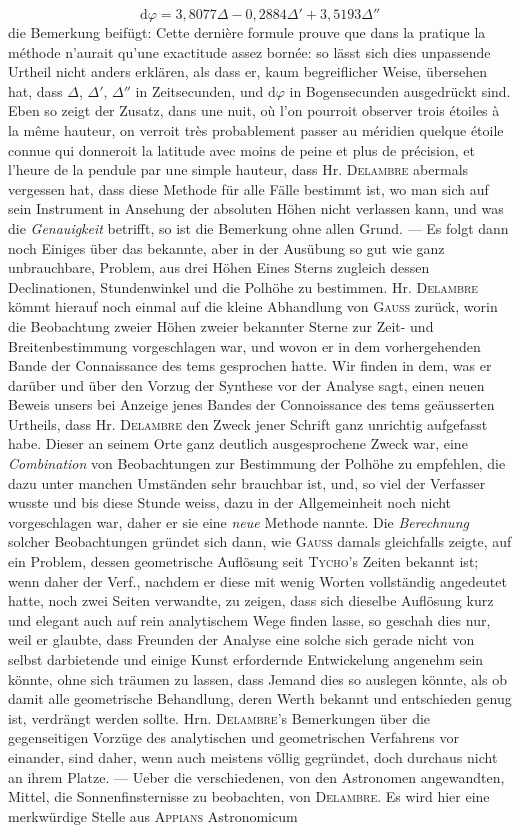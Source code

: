 \noindent \[ \mathrm{d}\varphi = 3{,}8077\Delta - 0{,}2884\Delta' + 3{,}5193\Delta'' \] die Bemerkung beifügt: Cette dernière formule prouve que dans la pratique la méthode n'aurait qu'une exactitude assez bornée: so lässt sich dies unpassende Urtheil nicht anders erklären, als dass er, kaum begreiflicher Weise, übersehen hat, dass $\Delta$, $\Delta'$, $\Delta''$ in Zeitsecunden, und $\mathrm{d}\varphi$ in Bogensecunden ausgedrückt sind. Eben so zeigt der Zusatz, dans une nuit, où l'on pourroit observer trois étoiles à la même hauteur, on verroit très probablement passer au méridien quelque étoile connue qui donneroit la latitude avec moins de peine et plus de précision, et l'heure de la pendule par une simple hauteur, dass Hr. \textsc{Delambre} abermals vergessen hat, dass diese Methode für alle Fälle bestimmt ist, wo man sich auf sein Instrument in Ansehung der absoluten Höhen nicht verlassen kann, und was die \emph{Genauigkeit} betrifft, so ist die Bemerkung ohne allen Grund. --- Es folgt dann noch Einiges über das bekannte, aber in der Ausübung so gut wie ganz unbrauchbare, Problem, aus drei Höhen Eines Sterns zugleich dessen Declinationen, Stundenwinkel und die Polhöhe zu bestimmen. Hr. \textsc{Delambre} kömmt hierauf noch einmal auf die kleine Abhandlung von \textsc{Gauss} zurück, worin die Beobachtung zweier Höhen zweier bekannter Sterne zur Zeit- und Breitenbestimmung vorgeschlagen war, und wovon er in dem vorhergehenden Bande der Connaissance des tems gesprochen hatte. Wir finden in dem, was er darüber und über den Vorzug der Synthese vor der Analyse sagt, einen neuen Beweis unsers bei Anzeige jenes Bandes der Connoissance des tems geäusserten Urtheils, dass Hr. \textsc{Delambre} den Zweck jener Schrift ganz unrichtig aufgefasst habe. Dieser an seinem Orte ganz deutlich ausgesprochene Zweck war, eine \emph{Combination} von Beobachtungen zur Bestimmung der Polhöhe zu empfehlen, die dazu unter manchen Umständen sehr brauchbar ist, und, so viel der Verfasser wusste und bis diese Stunde weiss, dazu in der Allgemeinheit noch nicht vorgeschlagen war, daher er sie eine \emph{neue} Methode nannte. Die \emph{Berechnung} solcher Beobachtungen gründet sich dann, wie \textsc{Gauss} damals gleichfalls zeigte, auf ein Problem, dessen geometrische Auflösung seit \textsc{Tycho}'s Zeiten bekannt ist; wenn daher der Verf., nachdem er diese mit wenig Worten vollständig angedeutet hatte, noch zwei Seiten verwandte, zu zeigen, dass sich dieselbe Auflösung kurz und elegant auch auf rein analytischem Wege finden lasse, so geschah dies nur, weil er glaubte, dass Freunden der Analyse eine solche sich gerade nicht von selbst darbietende und einige Kunst erfordernde Entwickelung angenehm sein könnte, ohne sich träumen zu lassen, dass Jemand dies so auslegen könnte, als ob damit alle geometrische Behandlung, deren Werth bekannt und entschieden genug ist, verdrängt werden sollte. Hrn. \textsc{Delambre}'s Bemerkungen über die gegenseitigen Vorzüge des analytischen und geometrischen Verfahrens vor einander, sind daher, wenn auch meistens völlig gegründet, doch durchaus nicht an ihrem Platze. --- Ueber die verschiedenen, von den Astronomen angewandten, Mittel, die Sonnenfinsternisse zu beobachten, von \textsc{Delambre}. Es wird hier eine merkwürdige Stelle aus \textsc{Appians} Astronomicum 